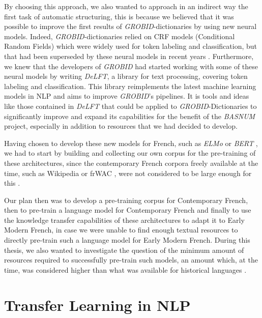 By choosing this approach, we also wanted to approach in an indirect way the first task of automatic structuring, this is because we believed that it was possible to improve the first results of \emph{GROBID}-dictionaries by using new neural models. Indeed, \emph{GROBID}-dictionaries relied on CRF models (Conditional Random Fields) \citep{lafferty-etal-2001-conditional} which were widely used for token labeling and classification, but that had been superseded by these neural models in recent years \citep{lample-etal-2016-neural,devlin-etal-2019-bert}. Furthermore, we knew that the developers of \emph{GROBID} had started working with some of these neural models by writing \emph{DeLFT}, a library for text processing, covering token labeling and classification. This library reimplements the latest machine learning models in NLP \citep{lopez-etal-2018-delft} and aims to improve \emph{GROBID}'s pipelines. It is tools and ideas like those contained in \emph{DeLFT} that could be applied to \emph{GROBID}-Dictionaries to significantly improve and expand its capabilities for the benefit of the \emph{BASNUM} project, especially in addition to resources that we had decided to develop.


Having chosen to develop these new models for French, such as \emph{ELMo} \citep{peters-etal-2018-deep} or \emph{BERT} \citep{devlin-etal-2019-bert}, we had to start by building and collecting our own corpus for the pre-training of these architectures, since the contemporary French corpora freely available at the time, such as Wikipedia or frWAC \citep{baroni-etal-2009-the}, were not considered to be large enough for this \citep{liu-etal-2019-roberta}.

Our plan then was to develop a pre-training corpus for Contemporary French, then to pre-train a language model for Contemporary French and finally to use the knowledge transfer capabilities of these architectures to adapt it to Early Modern French, in case we were unable to find enough textual resources to directly pre-train such a language model for Early Modern French. During this thesis, we also wanted to investigate the question of the minimum amount of resources required to successfully pre-train such models, an amount which, at the time, was considered higher than what was available for historical languages \citep{peters-etal-2018-deep,liu-etal-2019-roberta}.

\section{Transfer Learning in NLP}

